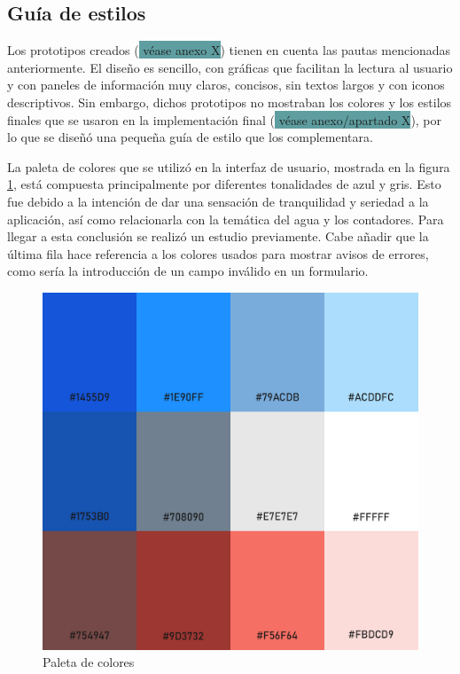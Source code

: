 \documentclass[pdftex,11pt,a4paper]{book}
\begin{document}

\subsection{Guía de estilos}

Los prototipos creados (\colorbox{CadetBlue}{ véase anexo X}) tienen en cuenta las pautas mencionadas anteriormente. El diseño es sencillo, con gráficas que facilitan la lectura al usuario y con paneles de información muy claros, concisos, sin textos largos y con iconos descriptivos.
Sin embargo, dichos prototipos no mostraban los colores y los estilos finales que se usaron en la implementación final (\colorbox{CadetBlue}{ véase anexo/apartado X}), por lo que se diseñó una pequeña guía de estilo que los complementara. 

La paleta de colores que se utilizó en la interfaz de usuario, mostrada en la figura \ref{fig:paleta}, está compuesta principalmente por diferentes tonalidades de azul y gris. Esto fue debido a la intención de dar una sensación de tranquilidad y seriedad a la aplicación, así como relacionarla con la temática del agua y los contadores. Para llegar a esta conclusión se realizó un estudio previamente. Cabe añadir que la última fila hace referencia a los colores usados para mostrar avisos de errores, como sería la introducción de un campo inválido en un formulario.

\begin{figure}[H]
 \centering
 \includegraphics [scale=0.35] {images/disenyo/paleta-final.png}
 \caption{Paleta de colores} \label{fig:paleta}
 \end{figure}
\end{document}
